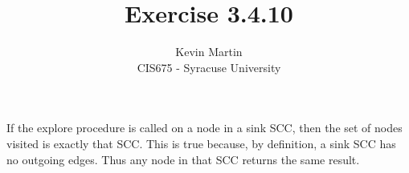 \documentclass{article}
\author{Kevin Martin\\ CIS675 - Syracuse University}
\title{Exercise 3.4.10}
\begin{document}
\maketitle
If the explore procedure is called on a node in a sink SCC, then the set of nodes visited is 
exactly that SCC. This is true because, by definition, a sink SCC has no outgoing edges.
Thus any node in that SCC returns the same result.
\end{document}
